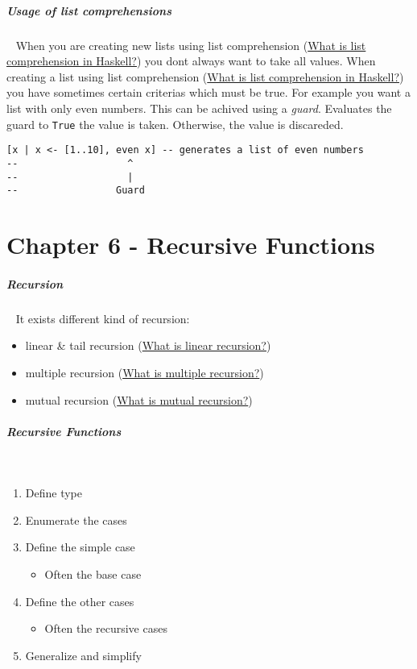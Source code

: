 \documentclass[11pt,twoside,landscape]{article}
\begin{document}
\begin{multicols}{3}
\subparagraph{Usage of list comprehensions} \
\label{sec:org793d3cd}
When you are creating new lists using list comprehension (\href{../../../roam/20220221080228-what_is_list_comprehension_in_haskell.org}{What is list comprehension in Haskell?}) you dont always want to take all values.
When creating a list using list comprehension (\href{../../../roam/20220221080228-what_is_list_comprehension_in_haskell.org}{What is list comprehension in Haskell?}) you have sometimes certain criterias which must be true.
For example you want a list with only even numbers.
This can be achived using a \emph{guard}.
Evaluates the guard to \texttt{True} the value is taken.
Otherwise, the value is discareded.

\lstset{language=haskell,label= ,caption= ,captionpos=b,numbers=none}
\begin{lstlisting}
[x | x <- [1..10], even x] -- generates a list of even numbers
--                   ^
--                   |
--                 Guard
\end{lstlisting}

\section{Chapter 6 - Recursive Functions}
\label{sec:org7b49ee3}
\subparagraph{Recursion} \
\label{sec:org2e87530}
It exists different kind of recursion:
\begin{itemize}
\item linear \& tail recursion (\href{../../../roam/20220307065956-what_is_linear_recursion.org}{What is linear recursion?})
\item multiple recursion (\href{../../../roam/20220307071006-what_is_multiple_recursion.org}{What is multiple recursion?})
\item mutual recursion (\href{../../../roam/20220307071331-what_is_mutual_recursion.org}{What is mutual recursion?})
\end{itemize}


\subparagraph{Recursive Functions} \
\label{sec:org4bee947}
\begin{enumerate}
\item Define type
\item Enumerate the cases
\item Define the simple case
\begin{itemize}
\item Often the base case
\end{itemize}
\item Define the other cases
\begin{itemize}
\item Often the recursive cases
\end{itemize}
\item Generalize and simplify
\end{enumerate}



\end{multicols}
\end{document}
